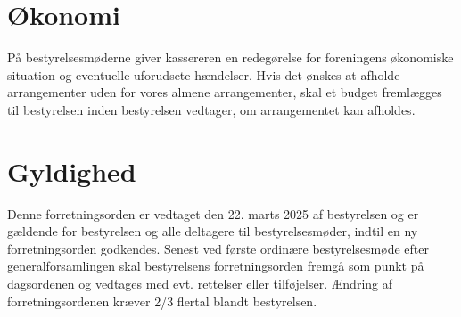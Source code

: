 \section{Økonomi}
På bestyrelsesmøderne giver kassereren en redegørelse for foreningens økonomiske situation og eventuelle 
uforudsete hændelser. Hvis det ønskes at afholde arrangementer uden for vores almene arrangementer, skal et 
budget fremlægges til bestyrelsen inden bestyrelsen vedtager, om arrangementet kan afholdes.

\section{Gyldighed}
Denne forretningsorden er vedtaget den 22. marts 2025 af bestyrelsen og er gældende for bestyrelsen og 
alle deltagere til bestyrelsesmøder, indtil en ny forretningsorden godkendes. Senest ved første ordinære 
bestyrelsesmøde efter generalforsamlingen skal bestyrelsens forretningsorden fremgå som punkt på dagsordenen 
og vedtages med evt. rettelser eller tilføjelser. Ændring af forretningsordenen kræver 2/3 flertal blandt 
bestyrelsen.


